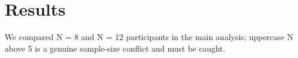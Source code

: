 \section{Results}
We compared N = 8 and N = 12 participants in the main analysis;
uppercase N above 5 is a genuine sample-size conflict and must be caught.
